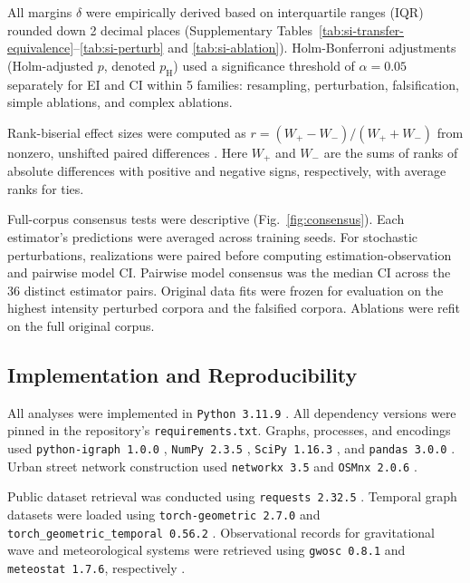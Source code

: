 \documentclass{article}
\begin{document}
All margins $\delta$ were empirically derived based on interquartile ranges (IQR) rounded down 2 decimal places (Supplementary Tables~\ref{tab:si-transfer-equivalence}--\ref{tab:si-perturb} and \ref{tab:si-ablation}). Holm-Bonferroni adjustments (Holm-adjusted $p$, denoted $p_{\mathrm H}$) \citep{ref46} used a significance threshold of $\alpha = 0.05$ separately for EI and CI within 5 families: resampling, perturbation, falsification, simple ablations, and complex ablations.

Rank-biserial effect sizes were computed as $r = (W_{+} - W_{-})/(W_{+} + W_{-})$ from nonzero, unshifted paired differences \citep{ref71}. Here $W_{+}$ and $W_{-}$ are the sums of ranks of absolute differences with positive and negative signs, respectively, with average ranks for ties.

Full-corpus consensus tests were descriptive (Fig.~\ref{fig:consensus}). Each estimator's predictions were averaged across training seeds. For stochastic perturbations, realizations were paired before computing estimation-observation and pairwise model CI. Pairwise model consensus was the median CI across the 36 distinct estimator pairs. Original data fits were frozen for evaluation on the highest intensity perturbed corpora and the falsified corpora. Ablations were refit on the full original corpus.

\subsection*{Implementation and Reproducibility}
\label{sub-sec:imp-rep}

All analyses were implemented in \texttt{Python 3.11.9} \citep{ref86,ref102}. All dependency versions were pinned in the repository's \texttt{requirements.txt}. Graphs, processes, and encodings used \texttt{python-igraph 1.0.0} \citep{ref48,ref93}, \texttt{NumPy 2.3.5} \citep{ref81,ref96}, \texttt{SciPy 1.16.3} \citep{ref82,ref97}, and \texttt{pandas 3.0.0} \citep{ref83,ref84}. Urban street network construction used \texttt{networkx 3.5} \citep{ref91,ref98} and \texttt{OSMnx 2.0.6} \citep{ref118,ref119}.

Public dataset retrieval was conducted using \texttt{requests 2.32.5} \citep{ref120}. Temporal graph datasets were loaded using \texttt{torch-geometric 2.7.0} \citep{ref89,ref99} and \texttt{torch\_geometric\_temporal 0.56.2} \citep{ref90,ref100}. Observational records for gravitational wave and meteorological systems were retrieved using \texttt{gwosc 0.8.1} and \texttt{meteostat 1.7.6}, respectively \citep{ref116,ref117}.
\end{document}
